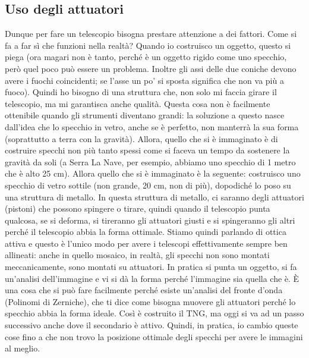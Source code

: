 \documentclass[a4paper,11pt]{article}
\begin{document}
 
\subsection{Uso degli attuatori}
Dunque per fare un telescopio bisogna prestare attenzione a dei fattori. Come si fa a far sì che funzioni nella realtà? Quando io costruisco un oggetto, questo si piega (ora magari non è tanto, perché è un oggetto rigido come uno specchio, però quel poco può essere un problema. Inoltre gli assi delle due coniche devono avere i fuochi coincidenti; se l’asse un po’ si sposta significa che non va più a fuoco). Quindi ho bisogno di una struttura che, non solo mi faccia girare il telescopio, ma mi garantisca anche qualità. Questa cosa non è facilmente ottenibile quando gli strumenti diventano grandi: la soluzione a questo nasce dall’idea che lo specchio in vetro, anche se è perfetto, non manterrà la sua forma (soprattutto a terra con la gravità). Allora, quello che si è immaginato è di costruire specchi non più tanto spessi come si faceva un tempo da sostenere la gravità da soli (a Serra La Nave, per esempio, abbiamo uno specchio di 1 metro che è alto 25 cm). Allora quello che si è immaginato è la seguente: costruisco uno specchio di vetro sottile (non grande, 20 cm, non di più), dopodiché lo poso su una struttura di metallo. In questa struttura di metallo, ci saranno degli attuatori (pistoni) che possono spingere o tirare, quindi quando il telescopio punta qualcosa, se si deforma, si tireranno gli attuatori giusti e si spingeranno gli altri perché il telescopio abbia la forma ottimale. Stiamo quindi parlando di ottica attiva e questo è l’unico modo per avere i telescopi effettivamente sempre ben allineati: anche in quello mosaico, in realtà, gli specchi non sono montati meccanicamente, sono montati su attuatori. In pratica si punta un oggetto, si fa un’analisi dell’immagine e vi si dà la forma perché l’immagine sia quella che è. È una cosa che si può fare facilmente perché esiste un’analisi del fronte d’onda (Polinomi di Zerniche), che ti dice come bisogna muovere gli attuatori perché lo specchio abbia la forma ideale. Così è costruito il TNG, ma oggi si va ad un passo successivo anche dove il secondario è attivo. Quindi, in pratica, io cambio queste cose fino a che non trovo la posizione ottimale degli specchi per avere le immagini al meglio.
\end{document}
